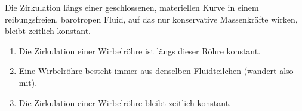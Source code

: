 			\begin{minipage}{19cm}
				Die Zirkulation längs einer geschlossenen, materiellen Kurve in einem reibungsfreien, barotropen Fluid, auf das nur konservative Massenkräfte wirken, bleibt zeitlich konstant.
			\end{minipage}
		\newline
			\begin{minipage}{19cm}
				\begin{enumerate}
					\item Die Zirkulation einer Wirbelröhre ist längs dieser Röhre konstant.
					\item Eine Wirbelröhre besteht immer aus denselben Fluidteilchen (wandert also mit).
					\item Die Zirkulation einer Wirbelröhre bleibt zeitlich konstant.
				\end{enumerate}
			\end{minipage}
		
